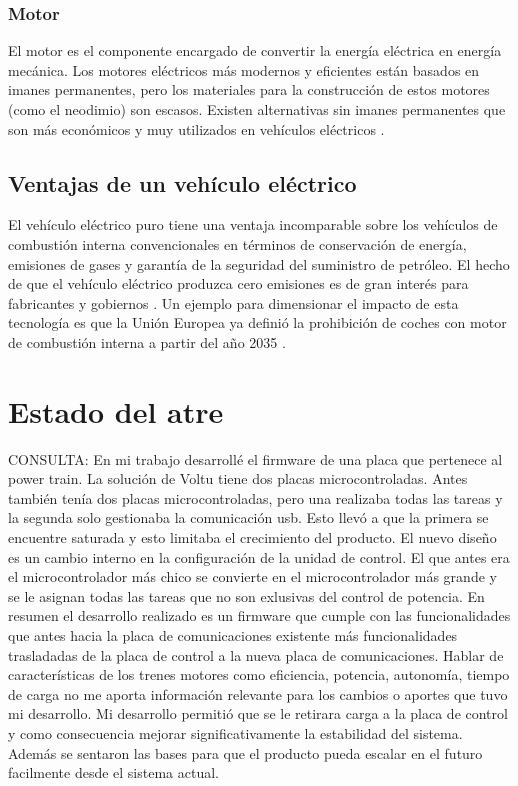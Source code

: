\subsubsection{Motor}
El motor es el componente encargado de convertir la energía eléctrica en energía mecánica. Los motores eléctricos más modernos y eficientes están basados en imanes permanentes, 
pero los materiales para la construcción de estos motores (como el neodimio) son escasos. Existen alternativas sin imanes permanentes que son más económicos y muy utilizados en 
vehículos eléctricos \citep{helmers2012electric}.

\subsection{Ventajas de un vehículo eléctrico}

El vehículo eléctrico puro tiene una ventaja incomparable sobre los vehículos de combustión interna convencionales en términos de conservación de energía, emisiones de gases y garantía de la seguridad 
del suministro de petróleo. El hecho de que el vehículo eléctrico produzca cero emisiones es de gran interés para fabricantes y gobiernos \citep{karki2020status}.
Un ejemplo para dimensionar el impacto de esta tecnología es que la Unión Europea ya definió la prohibición de coches con motor de combustión interna a partir del año 2035 \citep{WEBSITE:1}.


\section{Estado del atre}

CONSULTA: En mi trabajo desarrollé el firmware de una placa que pertenece al power train. La solución de Voltu tiene dos placas microcontroladas. Antes también tenía dos placas microcontroladas, pero una realizaba todas las tareas y la segunda solo gestionaba la comunicación usb.
Esto llevó a que la primera se encuentre saturada y esto limitaba el crecimiento del producto.
El nuevo diseño es un cambio interno en la configuración de la unidad de control. El que antes era el microcontrolador más chico se convierte en el microcontrolador más 
grande y se le asignan todas las tareas que no son exlusivas del control de potencia.
En resumen el desarrollo realizado es un firmware que cumple con las funcionalidades que 
antes hacia la placa de comunicaciones existente más funcionalidades trasladadas de la placa de control a la nueva placa de comunicaciones.
Hablar de características de los trenes motores como eficiencia, potencia, autonomía, tiempo de carga no me aporta información relevante para los cambios o aportes que tuvo mi desarrollo.
Mi desarrollo permitió que se le retirara carga a la placa de control y como consecuencia mejorar significativamente la estabilidad del sistema. Además se sentaron las bases para que el 
producto pueda escalar en el futuro facilmente desde el sistema actual.

